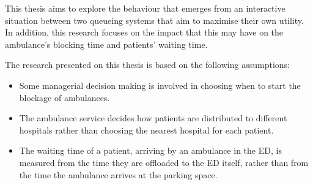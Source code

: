 This thesis aims to explore the behaviour that emerges from an interactive
situation between two queueing systems that aim to maximise their own utility.
In addition, this research focuses on the impact that this may have on the
ambulance's blocking time and patients' waiting time.

The research presented on this thesis is based on the following assumptions:
\begin{itemize}
    \item Some managerial decision making is involved in choosing when to start
    the blockage of ambulances.
    \item The ambulance service decides how patients are distributed to
    different hospitals rather than choosing the nearest hospital for each
    patient.
    \item The waiting time of a patient, arriving by an ambulance in the ED, is
    measured from the time they are offloaded to the ED itself, rather than
    from the time the ambulance arrives at the parking space.
\end{itemize}


